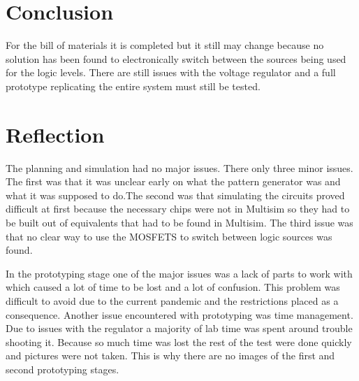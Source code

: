 \documentclass[12pt]{article}
\begin{document}
    \section{Conclusion}
    For the bill of materials it is completed but it still may change because no solution has been found to electronically switch between the sources being used for the logic levels. There are still issues with the voltage regulator and a full prototype replicating the entire system must still be tested.

    \section{Reflection}
    The planning and simulation had no major issues. There only three minor issues. The first was that it was unclear early on what the pattern generator was and what it was supposed to do.The second was that simulating the circuits proved difficult at first because the necessary chips were not in Multisim so they had to be built out of equivalents that had to be found in Multisim. The third issue was that no clear way to use the MOSFETS to switch between logic sources was found.
    \par In the prototyping stage one of the major issues was a lack of parts to work with which caused a lot of time to be lost and a lot of confusion. This problem was difficult to avoid due to the current pandemic and the restrictions placed as a consequence. Another issue encountered with prototyping was time management. Due to issues with the regulator a majority of lab time was spent around trouble shooting it. Because so much time was lost the rest of the test were done quickly and pictures were not taken. This is why there are no images of the first and second prototyping stages.
\end{document}
